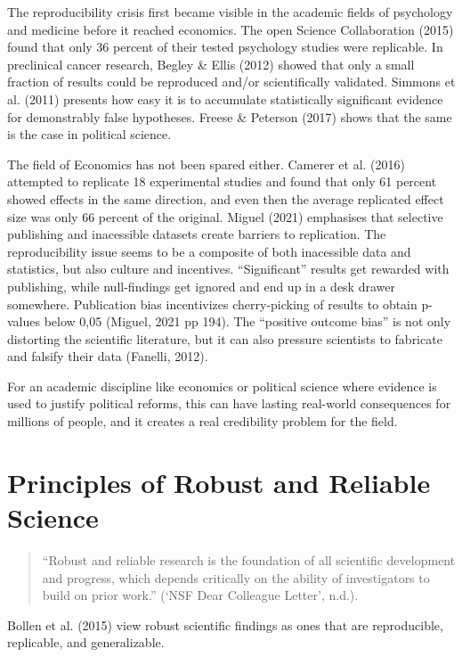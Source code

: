 \documentclass[
  a4paper,
]{article}
\begin{document}
The reproducibility crisis first became visible in the academic fields
of psychology and medicine before it reached economics. The open Science
Collaboration (2015) found that only 36 percent of their tested
psychology studies were replicable. In preclinical cancer research,
Begley \& Ellis (2012) showed that only a small fraction of results
could be reproduced and/or scientifically validated. Simmons et al.
(2011) presents how easy it is to accumulate statistically significant
evidence for demonstrably false hypotheses. Freese \& Peterson (2017)
shows that the same is the case in political science.

The field of Economics has not been spared either. Camerer et al. (2016)
attempted to replicate 18 experimental studies and found that only 61
percent showed effects in the same direction, and even then the average
replicated effect size was only 66 percent of the original. Miguel
(2021) emphasises that selective publishing and inacessible datasets
create barriers to replication. The reproducibility issue seems to be a
composite of both inacessible data and statistics, but also culture and
incentives. ``Significant'' results get rewarded with publishing, while
null-findings get ignored and end up in a desk drawer somewhere.
Publication bias incentivizes cherry-picking of results to obtain
p-values below 0,05 (Miguel, 2021 pp 194). The ``positive outcome bias''
is not only distorting the scientific literature, but it can also
pressure scientists to fabricate and falsify their data (Fanelli, 2012).

For an academic discipline like economics or political science where
evidence is used to justify political reforms, this can have lasting
real-world consequences for millions of people, and it creates a real
credibility problem for the field.

\section{Principles of Robust and Reliable
Science}\label{principles-of-robust-and-reliable-science}

\begin{quote}
``Robust and reliable research is the foundation of all scientific
development and progress, which depends critically on the ability of
investigators to build on prior work.'' ({`{NSF Dear Colleague
Letter}'}, n.d.).
\end{quote}

Bollen et al. (2015) view robust scientific findings as ones that are
reproducible, replicable, and generalizable.
\end{document}
